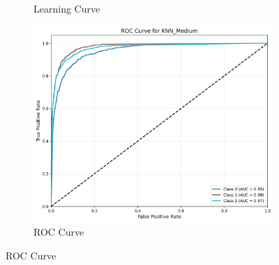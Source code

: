 \documentclass[10pt]{article}
\begin{document}
\begin{figure}[!ht]
\begin{subfigure}{0.33\textwidth}
            \caption{Learning Curve}
        \end{subfigure}
        \begin{subfigure}{0.33\textwidth}
            \centering
            \includegraphics[width=\textwidth]{code/ResultsMainAugZip/plots/Block2_KNN_Variants_Experiment_I/roc_curve_KNN_Medium.png}
            \caption{ROC Curve}
        \end{subfigure}
    \end{figure}
    
\end{document}
